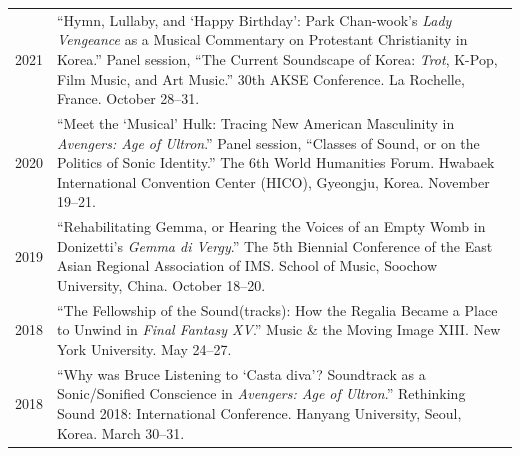 \documentclass[a4paper,11pt,draft]{article}
\begin{document}
  \hspace*{-0.25cm}
  \begin{tabular}{p{2.5cm} p{12.5cm}}
  	2021 & ``Hymn, Lullaby, and `Happy Birthday': Park Chan-wook's \textit{Lady Vengeance} as a Musical Commentary on Protestant Christianity in Korea.'' Panel session, ``The Current Soundscape of Korea: \textit{Trot}, K-Pop, Film Music, and Art Music.'' 30th AKSE Conference. La Rochelle, France. October 28--31.\\[2mm]
  	
  	
  	2020 & ``Meet the `Musical' Hulk: Tracing New American Masculinity in \textit{Avengers: Age of Ultron}.'' Panel session, ``Classes of Sound, or on the Politics of Sonic Identity.'' The 6th World Humanities Forum. Hwabaek International Convention Center (HICO), Gyeongju, Korea. November 19--21.\\[2mm]

  
    2019 & ``Rehabilitating Gemma, or Hearing the Voices of an Empty Womb in Donizetti's \textit{Gemma di Vergy}.'' The 5th Biennial Conference of the East Asian Regional Association of IMS. School of Music, Soochow University, China. October 18--20.\\[2mm]
  
  
    2018 & ``The Fellowship of the Sound(tracks): How the Regalia Became a Place to Unwind in \textit{Final Fantasy XV}.'' Music \& the Moving Image XIII. New York University. May 24--27.\\[2mm]
  
    2018 & ``Why was Bruce Listening to `Casta diva'? Soundtrack as a Sonic/Sonified Conscience in \textit{Avengers: Age of Ultron}.'' Rethinking Sound 2018: International Conference. Hanyang University, Seoul, Korea. March 30--31.\\[2mm]
  

\end{tabular}
\end{document}
